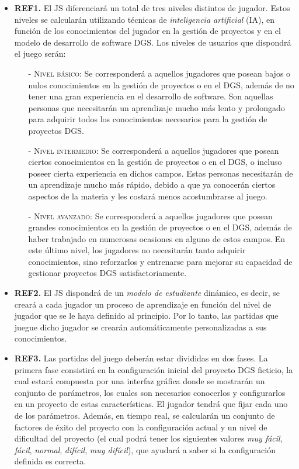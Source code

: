 \begin{itemize}
	\item \textbf{REF1.} El JS diferenciará un total de tres niveles distintos de jugador. Estos niveles se calcularán utilizando técnicas de \emph{inteligencia artificial} (IA), en función de los conocimientos del jugador en la gestión de proyectos y en el modelo de desarrollo de software DGS. Los niveles de usuarios que dispondrá el juego serán:
	\begin{itemize}
		\item[-] \textsc{Nivel básico:} Se corresponderá a aquellos jugadores que posean bajos o nulos conocimientos en la gestión de proyectos o en el DGS, además de no tener una gran experiencia en el desarrollo de software. Son aquellas personas que necesitarán un aprendizaje mucho más lento y prolongado para adquirir todos los conocimientos necesarios para la gestión de proyectos DGS.
		\item[-] \textsc{Nivel intermedio:} Se corresponderá a aquellos jugadores que posean ciertos conocimientos en la gestión de proyectos o en el DGS, o incluso poseer cierta experiencia en dichos campos. Estas personas necesitarán de un aprendizaje mucho más rápido, debido a que ya conocerán ciertos aspectos de la materia y les costará menos acostumbrarse al juego.
		\item[-] \textsc{Nivel avanzado:} Se corresponderá a aquellos jugadores que posean grandes conocimientos en la gestión de proyectos o en el DGS, además de haber trabajado en numerosas ocasiones en alguno de estos campos. En este último nivel, los jugadores no necesitarán tanto adquirir conocimientos, sino reforzarlos y entrenarse para mejorar su capacidad de gestionar proyectos DGS satisfactoriamente.
	\end{itemize}
	
	\item \textbf{REF2.} El JS dispondrá de un \emph{modelo de estudiante} dinámico, es decir, se creará a cada jugador un proceso de aprendizaje en función del nivel de jugador que se le haya definido al principio. Por lo tanto, las partidas que juegue dicho jugador se crearán automáticamente personalizadas a sus conocimientos.
	
	\item \textbf{REF3.} Las partidas del juego deberán estar divididas en dos fases. La primera fase consistirá en la configuración inicial del proyecto DGS ficticio, la cual estará compuesta por una interfaz gráfica donde se mostrarán un conjunto de parámetros, los cuales son necesarios conocerlos y configurarlos en un proyecto de estas características. El jugador tendrá que fijar cada uno de los parámetros. Además, en tiempo real, se calcularán un conjunto de factores de éxito del proyecto con la configuración actual y un nivel de dificultad del proyecto (el cual podrá tener los siguientes valores \emph{muy fácil}, \emph{fácil}, \emph{normal}, \emph{difícil}, \emph{muy difícil}), que ayudará a saber si la configuración definida es correcta.
	

\end{itemize}
